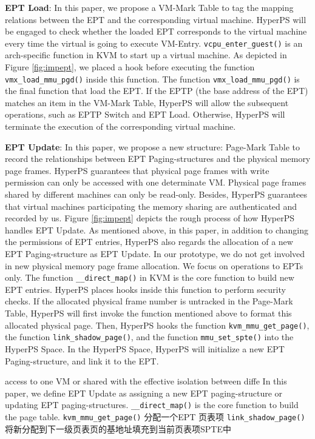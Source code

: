 \textbf{EPT Load}: 
In this paper, we propose a VM-Mark Table to tag the mapping relations between the EPT and the corresponding virtual machine. 
HyperPS will be engaged to check whether the loaded EPT corresponds to the virtual machine every time the virtual is going to execute VM-Entry. 
\verb|vcpu_enter_guest()| is an arch-specific function in KVM to start up a virtual machine. 
As depicted in Figure \ref{fig:impept}, we placed a hook before executing the function \verb|vmx_load_mmu_pgd()| inside this function. The function \verb|vmx_load_mmu_pgd()| is the final function that load the EPT. 
If the EPTP (the base address of the EPT) matches an item in the VM-Mark Table, HyperPS will allow the subsequent operations, such as EPTP Switch and EPT Load. Otherwise, HyperPS will terminate the execution of the corresponding virtual machine. 

\textbf{EPT Update}: 
In this paper, we propose a new structure: Page-Mark Table to record the relationships between EPT Paging-structures and the physical memory page frames. 
HyperPS guarantees that physical page frames with write permission can only be accessed with one determinate VM. 
Physical page frames shared by different machines can only be read-only. 
Besides, HyperPS guarantees that virtual machines participating the memory sharing are authenticated and recorded by us. 
Figure \ref{fig:impept} depicts the rough process of how HyperPS handles EPT Update. 
As mentioned above, in this paper, in addition to changing the permissions of EPT entries, HyperPS also regards the allocation of a new EPT Paging-structure as EPT Update. 
In our prototype, we do not get involved in new physical memory page frame allocation. We focus on operations to EPTs only. 
The function \verb|__direct_map()| in KVM is the core function to build new EPT entries. HyperPS places hooks inside this function to perform security checks. If the allocated physical frame number is untracked in the Page-Mark Table, HyperPS will first invoke the function mentioned above to format this allocated physical page. Then, HyperPS hooks the function \verb|kvm_mmu_get_page()|, the function \verb|link_shadow_page()|, and the function \verb|mmu_set_spte()| into the HyperPS Space.
In the HyperPS Space, HyperPS will initialize a new EPT Paging-structure, and link it to the EPT.

\iffalse
access to one VM or shared with
the effective isolation between diffe
In this paper, we define EPT Update as assigning a new EPT paging-structure or updating EPT paging-structures. 
\verb|__direct_map()| is the core function to build the page table.
\verb|kvm_mmu_get_page()| 分配一个EPT 页表项 
\verb|link_shadow_page()| 将新分配到下一级页表页的基地址填充到当前页表项SPTE中


